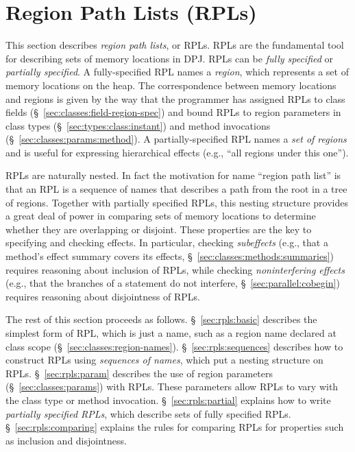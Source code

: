 \section{Region Path Lists (RPLs)%
\label{sec:rpls}}

This section describes \emph{region path lists}, or RPLs.  RPLs are
the fundamental tool for describing sets of memory locations in DPJ.
RPLs can be \emph{fully specified} or \emph{partially specified}.  A
fully-specified RPL names a \emph{region}, which represents a set of
memory locations on the heap. The correspondence between memory
locations and regions is given by the way that the programmer has
assigned RPLs to class fields (\S~\ref{sec:classes:field-region-spec})
and bound RPLs to region parameters in class types
(\S~\ref{sec:types:class:instant}) and method invocations
(\S~\ref{sec:classes:params:method}). A partially-specified RPL names
a \emph{set of regions} and is useful for expressing hierarchical
effects (e.g., ``all regions under this one'').

RPLs are naturally nested.  In fact the motivation for name ``region
path list'' is that an RPL is a sequence of names that describes a
path from the root in a tree of regions.  Together with partially
specified RPLs, this nesting structure provides a great deal of power
in comparing sets of memory locations to determine whether they are
overlapping or disjoint.  These properties are the key to specifying
and checking effects.  In particular, checking \emph{subeffects}
(e.g., that a method's effect summary covers its effects,
\S~\ref{sec:classes:methods:summaries}) requires reasoning about
inclusion of RPLs, while checking \emph{noninterfering effects} (e.g.,
that the branches of a  statement do not interfere,
\S~\ref{sec:parallel:cobegin}) requires reasoning about disjointness
of RPLs.

The rest of this section proceeds as follows.  \S~\ref{sec:rpls:basic}
describes the simplest form of RPL, which is just a name, such as a
region name declared at class scope
(\S~\ref{sec:classes:region-names}).  \S~\ref{sec:rpls:sequences}
describes how to construct RPLs using \emph{sequences of names}, which
put a nesting structure on RPLs.  \S~\ref{sec:rpls:param} describes
the use of region parameters (\S~\ref{sec:classes:params}) with RPLs.
These parameters allow RPLs to vary with the class type or method
invocation.  \S~\ref{sec:rpls:partial} explains how to write
\emph{partially specified RPLs}, which describe sets of fully
specified RPLs.  \S~\ref{sec:rpls:comparing} explains the rules for
comparing RPLs for properties such as inclusion and disjointness.

